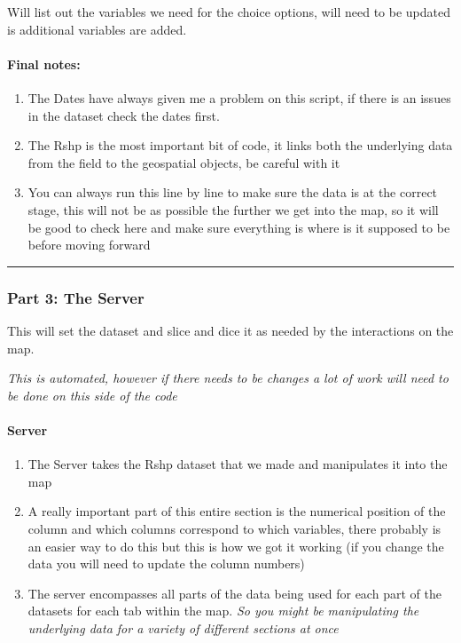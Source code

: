 \documentclass[
]{article}
\providecommand{\tightlist}{%
  \setlength{\itemsep}{0pt}\setlength{\parskip}{0pt}}
\begin{document}
Will list out the variables we need for the choice options, will need to
be updated is additional variables are added.

\hypertarget{final-notes-1}{%
\paragraph{Final notes:}\label{final-notes-1}}

\begin{enumerate}
\def\labelenumi{\arabic{enumi}.}
\tightlist
\item
  The Dates have always given me a problem on this script, if there is
  an issues in the dataset check the dates first.
\item
  The Rshp is the most important bit of code, it links both the
  underlying data from the field to the geospatial objects, be careful
  with it
\item
  You can always run this line by line to make sure the data is at the
  correct stage, this will not be as possible the further we get into
  the map, so it will be good to check here and make sure everything is
  where is it supposed to be before moving forward
\end{enumerate}

\begin{center}\rule{0.5\linewidth}{0.5pt}\end{center}

\hypertarget{part-3-the-server}{%
\subsubsection{Part 3: The Server}\label{part-3-the-server}}

This will set the dataset and slice and dice it as needed by the
interactions on the map.

\emph{This is automated, however if there needs to be changes a lot of
work will need to be done on this side of the code }

\hypertarget{server}{%
\paragraph{Server}\label{server}}

\begin{enumerate}
\def\labelenumi{\arabic{enumi}.}
\tightlist
\item
  The Server takes the Rshp dataset that we made and manipulates it into
  the map
\item
  A really important part of this entire section is the numerical
  position of the column and which columns correspond to which
  variables, there probably is an easier way to do this but this is how
  we got it working (if you change the data you will need to update the
  column numbers)
\item
  The server encompasses all parts of the data being used for each part
  of the datasets for each tab within the map. \emph{So you might be
  manipulating the underlying data for a variety of different sections
  at once}
\end{enumerate}
\end{document}

